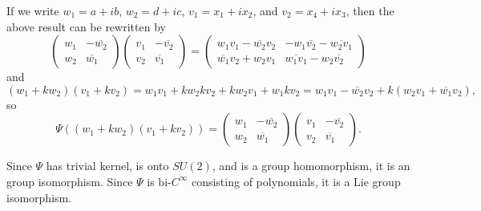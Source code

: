 \documentclass[a4paper, 12pt]{article}
\theoremstyle{Mydefinition}
\theoremstyle{Mytheorem}
\begin{document}
If we write $w_1 = a+ib$, $w_2 = d+ic$, $v_1 = x_1+ix_2$, and $v_2 = x_4+ix_3$, then the above result can be rewritten by
\begin{equation*}
    \begin{pmatrix}
        w_1 & -\overline{w_2}\\
        w_2 & \overline{w_1}
    \end{pmatrix}\begin{pmatrix}
        v_1 & -\overline{v_2}\\
        v_2 & \overline{v_1}
    \end{pmatrix} = \begin{pmatrix}
        w_1v_1-\overline{w_2}v_2 & -w_1\overline{v_2}-\overline{w_2v_1}\\
        \overline{w_1}v_2+w_2v_1 & \overline{w_1v_1}-w_2\overline{v_2}
    \end{pmatrix}
\end{equation*}
and
\begin{equation*}
    (w_1+kw_2)(v_1+kv_2) =w_1v_1+kw_2kv_2 + kw_2v_1+w_1kv_2 = w_1v_1 - \overline{w_2}v_2 + k(w_2v_1+\overline{w_1}v_2),
\end{equation*}
so
\begin{equation*}
    \Psi\left((w_1+kw_2)(v_1+kv_2)\right) = \begin{pmatrix}
        w_1 & -\overline{w_2}\\
        w_2 & \overline{w_1}
    \end{pmatrix}\begin{pmatrix}
        v_1 & -\overline{v_2}\\
        v_2 & \overline{v_1}
    \end{pmatrix}.
\end{equation*}

Since $\Psi$ has trivial kernel, is onto $\mathit{SU}(2)$, and is a group homomorphism, it is an group isomorphism. Since $\Psi$ is bi-$C^\infty$ consisting of polynomials, it is a Lie group isomorphism.\\
\end{document}
